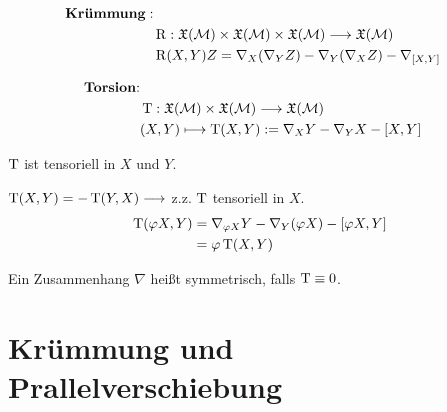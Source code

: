 \begin{align*}
\text{\textbf{Krümmung}}:\\
&\operatorname{R}: \mathfrak{X}(\mathcal{M}) \times \mathfrak{X}(\mathcal{M}) \times \mathfrak{X}(\mathcal{M}) \longrightarrow \mathfrak{X}(\mathcal{M}) \\
&\operatorname{R}(X,Y)Z = \nabla_X(\nabla_YZ) - \nabla_Y(\nabla_XZ) - \nabla_{[X,Y]}
\end{align*}


\begin{align*}
\text{\textbf{Torsion}:}\\
&\operatorname{T}: \mathfrak{X}(\mathcal{M}) \times \mathfrak{X}(\mathcal{M}) \longrightarrow \mathfrak{X}(\mathcal{M}) \\
&(X,Y) \longmapsto \operatorname{T}(X,Y) := \nabla_XY -\nabla_YX - [X,Y]
\end{align*}

\begin{lem}
$\operatorname{T}$ ist tensoriell in $X$ und $Y$.
\begin{bew}
$\operatorname{T}(X,Y) = -\operatorname{T}(Y,X)  \longrightarrow$ z.z. $\operatorname{T}$ tensoriell in $X$. 
\begin{align*}
\operatorname{T}(\varphi X,Y) &= \nabla_{\varphi X}Y -  \nabla_Y(\varphi X) - [\varphi X,Y] \\
						&= \varphi\operatorname{T}(X,Y)
\end{align*}
\end{bew}
\end{lem}

\begin{defs}
Ein Zusammenhang $\nabla$ heißt symmetrisch, falls $\operatorname{T} \equiv 0$.
\end{defs}


\section{Krümmung und Prallelverschiebung}

